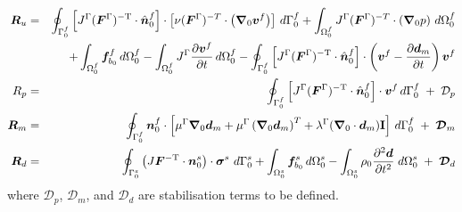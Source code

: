 \documentclass[sn-mathphys,Numbered]{sn-jnl}%
\newcommand{\bb}{\boldsymbol}
\begin{document}
\begin{eqnarray}
    \bb{R}_u %
    &=&
	\oint_{\Gamma^f_0}  \left[ J^\Gamma (\bb{F}^\Gamma)^{-\text{T}} \cdot \hat{\bb{n}}_0^f \right]
		\cdot \left[\nu (\bb{F}^\Gamma)^{-T} \cdot \left( \bb{\nabla}_0 \bb{v}^f \right) \right] \, d\Gamma^f_0
	+ \int_{\Omega^f_0} J^\Gamma (\bb{F}^\Gamma)^{-T} \cdot \left( \bb{\nabla}_0 p \right) \, d\Omega^f_0 \notag \\
	&&+ \int_{\Omega^f_0} \bb{f}_{b_0}^f \, d\Omega^f_0
	- \int_{\Omega^f_0} J^\Gamma \frac{\partial \bb{v}^f}{\partial t} \, d\Omega^f_0 
	- \oint_{\Gamma^f_0}  \left[ J^\Gamma (\bb{F}^\Gamma)^{-\text{T}} \cdot \hat{\bb{n}}_0^f \right] \cdot \left(\bb{v}^f - \frac{\partial \bb{d}_m}{\partial t}\right) \bb{v}^f
	\notag \\
    R_p %
    &=&	\oint_{\Gamma^f_0}  \left[ J^\Gamma (\bb{F}^\Gamma)^{-\text{T}}  \cdot \hat{\bb{n}}_0^f \right] \cdot \bb{v}^f \, d\Gamma^f_0 \;+\; \mathcal{D}_p
    \notag \\
    \bb{R}_m %
    &=&
    \oint_{\Gamma_0^f} \bb{n}_0^f \cdot
    \left[
    \mu^\Gamma \bb{\nabla}_0 \bb{d}_m + \mu^\Gamma \left(\bb{\nabla}_0 \bb{d}_m \right)^T
    + \lambda^\Gamma (\bb{\nabla}_0 \cdot \bb{d}_m) \textbf{I}
    \right]
    \, d\Gamma_0^f
    \;+\; \bb{\mathcal{D}}_m
    \notag \\
    \bb{R}_d %
    &=&
    \oint_{\Gamma_0^s} \left( J \bb{F}^{-\text{T}} \cdot \bb{n}_0^s \right) \cdot \bb{\sigma}^s \ d\Gamma_0^s
    + \int_{\Omega_0^s}  \bb{f}_{b_0}^s \, d\Omega_0^s
    - \int_{\Omega_0^s} \rho_0 \frac{\partial^2 \bb{d} }{\partial t^2} \; d\Omega_0^s
    \;+\; \bb{\mathcal{D}}_d
\end{eqnarray}
where $\mathcal{D}_p$, $\bb{\mathcal{D}}_m$, and $\bb{\mathcal{D}}_d$ are stabilisation terms to be defined.
\end{document}
